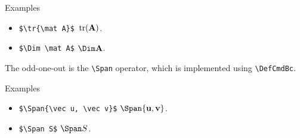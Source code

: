 \begin{myframe}{Examples}
    \begin{itemize}
        \item \verb|$\tr{\mat A}$| \produces{} $\tr{\mat A}$.
        \item \verb|$\Dim \mat A$| \produces{} $\Dim \mat A$.
    \end{itemize}
\end{myframe}

The odd-one-out is the \verb|\Span| operator, which is implemented using \verb|\DefCmdBc|.

\begin{myframe}{Examples }
    \begin{itemize}
        \item \verb|$\Span{\vec u, \vec v}$| \produces{} $\Span{\vec u, \vec v}$.
        \item \verb|$\Span S$| \produces{} $\Span S$.
    \end{itemize}
\end{myframe}